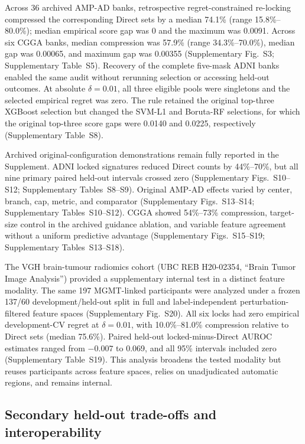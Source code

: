 Across 36 archived AMP-AD banks, retrospective regret-constrained re-locking compressed the corresponding Direct sets by a median 74.1\% (range 15.8\%--80.0\%); median empirical score gap was 0 and the maximum was 0.0091. Across six CGGA banks, median compression was 57.9\% (range 34.3\%--70.0\%), median gap was 0.00065, and maximum gap was 0.00355 (Supplementary Fig.~S3; Supplementary Table~S5). Recovery of the complete five-mask ADNI banks enabled the same audit without rerunning selection or accessing held-out outcomes. At absolute $\delta=0.01$, all three eligible pools were singletons and the selected empirical regret was zero. The rule retained the original top-three XGBoost selection but changed the SVM-L1 and Boruta-RF selections, for which the original top-three score gaps were 0.0140 and 0.0225, respectively (Supplementary Table~S8).

Archived original-configuration demonstrations remain fully reported in the Supplement. ADNI locked signatures reduced Direct counts by 44\%--70\%, but all nine primary paired held-out intervals crossed zero (Supplementary Figs.~S10--S12; Supplementary Tables~S8--S9). Original AMP-AD effects varied by center, branch, cap, metric, and comparator (Supplementary Figs.~S13--S14; Supplementary Tables~S10--S12). CGGA showed 54\%--73\% compression, target-size control in the archived guidance ablation, and variable feature agreement without a uniform predictive advantage (Supplementary Figs.~S15--S19; Supplementary Tables~S13--S18).

The VGH brain-tumour radiomics cohort (UBC REB H20-02354, ``Brain Tumor Image Analysis'') provided a supplementary internal test in a distinct feature modality. The same 197 MGMT-linked participants were analyzed under a frozen 137/60 development/held-out split in full and label-independent perturbation-filtered feature spaces (Supplementary Fig.~S20). All six locks had zero empirical development-CV regret at \(\delta=0.01\), with 10.0\%--81.0\% compression relative to Direct sets (median 75.6\%). Paired held-out locked-minus-Direct AUROC estimates ranged from \(-0.007\) to 0.069, and all 95\% intervals included zero (Supplementary Table~S19). This analysis broadens the tested modality but reuses participants across feature spaces, relies on unadjudicated automatic regions, and remains internal.

\subsection{Secondary held-out trade-offs and interoperability}

